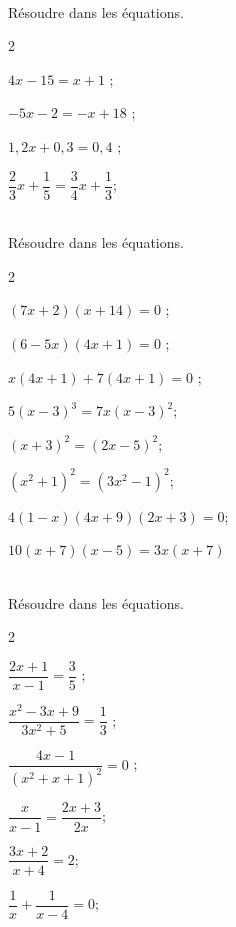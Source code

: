 \documentclass[11pt,a4paper]{article}  %
\begin{document}
	\graphicspath{{images/}}
	
	\begin{center}
		
		
	\end{center}

\\
Résoudre dans \R les équations.
\begin{multicols}{2}
	\begin{enumMet}
		\item $4 x-15=x+1$ ;
		\item $-5 x-2=-x+18$ ;
		\item $1,2 x+0,3=0,4$ ;
		\item $\dfrac{2}{3} x+\dfrac{1}{5}=\dfrac{3}{4} x+\dfrac{1}{3}$;
	\end{enumMet}
\end{multicols}

\\
Résoudre dans \R les équations.
\begin{multicols}{2}
	\begin{enumMet}
		\item $(7 x+2)(x+14)=0$ ;
		\item $(6-5 x)(4 x+1)=0$ ;
		\item $x(4 x+1)+7(4 x+1)=0$ ;
		\item $5(x-3)^3=7 x(x-3)^2$;
		\item $(x+3)^2=(2 x-5)^2$;
		\item $\left(x^2+1\right)^2=\left(3 x^2-1\right)^2$;
		\item $4(1-x)(4 x+9)(2 x+3)=0$;
		\item $10(x+7)(x-5)=3 x(x+7)$
	\end{enumMet}
\end{multicols}

\\
Résoudre dans \R les équations.
\begin{multicols}{2}
	\begin{enumMet}
		\item $\dfrac{2 x+1}{x-1}=\dfrac{3}{5}$ ;
		\item $\dfrac{x^2-3 x+9}{3 x^2+5}=\dfrac{1}{3}$ ;
		\item $\dfrac{4 x-1}{\left(x^2+x+1\right)^2}=0$ ;
		\item $\dfrac{x}{x-1}=\dfrac{2 x+3}{2 x}$;
		\item $\dfrac{3 x+2}{x+4}=2$;
		\item $\dfrac{1}{x}+\dfrac{1}{x-4}=0$;
	\end{enumMet}
\end{multicols}
\end{document}
